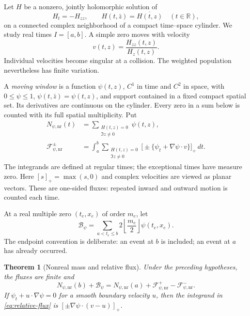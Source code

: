 \documentclass[11pt]{article}
\newcommand{\R}{\mathbb R}
\newcommand{\dd}{\,d}
\newcommand{\nr}{\mathrm{nr}}
\newcommand{\FF}{\mathcal F}
\newcommand{\BB}{\mathcal B}
\newtheorem{theorem}{Theorem}[section]
\theoremstyle{remark}
\begin{document}
Let $H$ be a nonzero, jointly holomorphic solution of
\begin{equation}
 H_t=-H_{zz},\qquad H(t,\bar z)=\overline{H(t,z)}\quad(t\in\R),
 \label{eq:heat}
\end{equation}
on a connected complex neighborhood of a compact time--space cylinder. We study real times
$I=[a,b]$. A simple zero moves with velocity
\begin{equation}
 v(t,z)=\frac{H_{zz}(t,z)}{H_z(t,z)}.
 \label{eq:velocity}
\end{equation}
Individual velocities become singular at a collision. The weighted
population nevertheless has finite variation.

A \emph{moving window} is a function $\psi(t,z)$, $C^1$ in time and $C^2$
in space, with $0\le\psi\le1$, $\psi(t,\bar z)=\psi(t,z)$, and support
contained in a fixed compact spatial set. Its derivatives are continuous
on the cylinder. Every zero in a sum below is counted with its full
spatial multiplicity. Put
\begin{align}
 N_{\psi,\nr}(t)&=\sum_{\substack{H(t,z)=0\\\Im z\ne0}}\psi(t,z),
 \label{eq:nonreal-population}\\
 \FF_{\psi,\nr}^{\pm}
 &=\int_a^b\sum_{\substack{H(t,z)=0\\\Im z\ne0}}
 \bigl[\pm\{\psi_t+\nabla\psi\cdot v\}\bigr]_+\dd t.
 \label{eq:relative-flux}
\end{align}
The integrands are defined at regular times; the exceptional times have
measure zero. Here $[s]_+=\max(s,0)$ and complex velocities are viewed as
planar vectors. These are one-sided fluxes: repeated inward and outward
motion is counted each time.

At a real multiple zero $(t_e,x_e)$ of order $m_e$, let
\begin{equation}
 \BB_\psi=\sum_{a<t_e\le b}
 2\left\lfloor\frac{m_e}{2}\right\rfloor\psi(t_e,x_e).
 \label{eq:birth-weight}
\end{equation}
The endpoint convention is deliberate: an event at $b$ is included; an
event at $a$ has already occurred.

\begin{theorem}[Nonreal mass and relative flux]
\label{thm:balance}
Under the preceding hypotheses, the fluxes are finite and
\begin{equation}
 \boxed{\quad
 N_{\psi,\nr}(b)+\BB_\psi
 =N_{\psi,\nr}(a)+\FF_{\psi,\nr}^{+}-\FF_{\psi,\nr}^{-}.
 \quad}
 \label{eq:balance}
\end{equation}
If $\psi_t+u\cdot\nabla\psi=0$ for a smooth boundary velocity $u$, then
the integrand in \eqref{eq:relative-flux} is
$[\pm\nabla\psi\cdot(v-u)]_+$.
\end{theorem}
\end{document}
